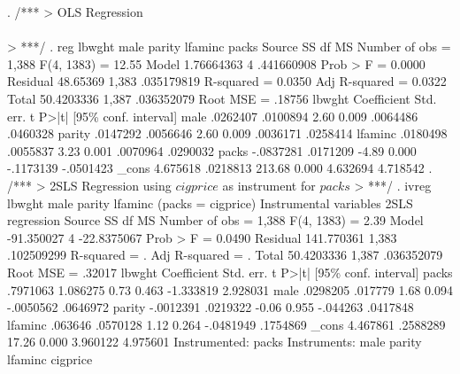. /***
> OLS Regression\\\\
> ***/
. reg lbwght male parity lfaminc packs
{\smallskip}
      Source {\VBAR}       SS           df       MS      Number of obs   =     1,388
   F(4, 1383)      =     12.55
       Model {\VBAR}  1.76664363         4  .441660908   Prob > F        =    0.0000
    Residual {\VBAR}    48.65369     1,383  .035179819   R-squared       =    0.0350
   Adj R-squared   =    0.0322
       Total {\VBAR}  50.4203336     1,387  .036352079   Root MSE        =    .18756
{\smallskip}
      lbwght {\VBAR} Coefficient  Std. err.      t    P>|t|     [95\% conf. interval]
        male {\VBAR}   .0262407   .0100894     2.60   0.009     .0064486    .0460328
      parity {\VBAR}   .0147292   .0056646     2.60   0.009     .0036171    .0258414
     lfaminc {\VBAR}   .0180498   .0055837     3.23   0.001     .0070964    .0290032
       packs {\VBAR}  -.0837281   .0171209    -4.89   0.000    -.1173139   -.0501423
       _cons {\VBAR}   4.675618   .0218813   213.68   0.000     4.632694    4.718542
{\smallskip}
. /***
> 2SLS Regression using $cigprice$ as instrument for $packs$
> ***/
. ivreg lbwght male parity lfaminc (packs = cigprice)
{\smallskip}
Instrumental variables 2SLS regression
{\smallskip}
      Source {\VBAR}       SS           df       MS      Number of obs   =     1,388
   F(4, 1383)      =      2.39
       Model {\VBAR}  -91.350027         4 -22.8375067   Prob > F        =    0.0490
    Residual {\VBAR}  141.770361     1,383  .102509299   R-squared       =         .
   Adj R-squared   =         .
       Total {\VBAR}  50.4203336     1,387  .036352079   Root MSE        =    .32017
{\smallskip}
      lbwght {\VBAR} Coefficient  Std. err.      t    P>|t|     [95\% conf. interval]
       packs {\VBAR}   .7971063   1.086275     0.73   0.463    -1.333819    2.928031
        male {\VBAR}   .0298205    .017779     1.68   0.094    -.0050562    .0646972
      parity {\VBAR}  -.0012391   .0219322    -0.06   0.955     -.044263    .0417848
     lfaminc {\VBAR}    .063646   .0570128     1.12   0.264    -.0481949    .1754869
       _cons {\VBAR}   4.467861   .2588289    17.26   0.000     3.960122    4.975601
Instrumented: packs
 Instruments: male parity lfaminc cigprice
{\smallskip}
